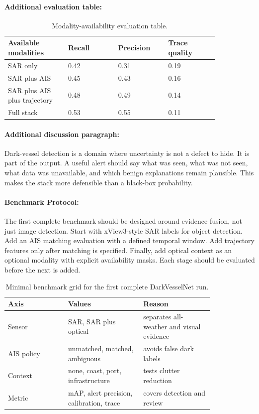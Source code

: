 \documentclass{article}
\begin{document}
\paragraph{Additional evaluation table:}

\begin{table}[t]
\centering
\caption{Modality-availability evaluation table.}
\begin{tabular}{@{}p{0.24\linewidth}p{0.20\linewidth}p{0.20\linewidth}p{0.20\linewidth}@{}}
\toprule
\textbf{Available modalities} & \textbf{Recall} & \textbf{Precision} & \textbf{Trace quality}\\
\midrule
SAR only & 0.42 & 0.31 & 0.19\\
SAR plus AIS & 0.45 & 0.43 & 0.16\\
SAR plus AIS plus trajectory & 0.48 & 0.49 & 0.14\\
Full stack & 0.53 & 0.55 & 0.11\\
\bottomrule
\end{tabular}
\end{table}

\paragraph{Additional discussion paragraph:}

Dark-vessel detection is a domain where uncertainty is not a defect to hide. It is part of the output. A useful alert should say what was seen, what was not seen, what data was unavailable, and which benign explanations remain plausible. This makes the stack more defensible than a black-box probability.

\paragraph{Benchmark Protocol:}

The first complete benchmark should be designed around evidence fusion, not just image detection. Start with xView3-style SAR labels for object detection. Add an AIS matching evaluation with a defined temporal window. Add trajectory features only after matching is specified. Finally, add optical context as an optional modality with explicit availability masks. Each stage should be evaluated before the next is added.

\begin{table}[t]
\centering
\caption{Minimal benchmark grid for the first complete DarkVesselNet run.}
\begin{tabular}{@{}p{0.24\linewidth}p{0.30\linewidth}p{0.28\linewidth}@{}}
\toprule
\textbf{Axis} & \textbf{Values} & \textbf{Reason}\\
\midrule
Sensor & SAR, SAR plus optical & separates all-weather and visual evidence\\
AIS policy & unmatched, matched, ambiguous & avoids false dark labels\\
Context & none, coast, port, infrastructure & tests clutter reduction\\
Metric & mAP, alert precision, calibration, trace & covers detection and review\\
\bottomrule
\end{tabular}
\end{table}
\end{document}
